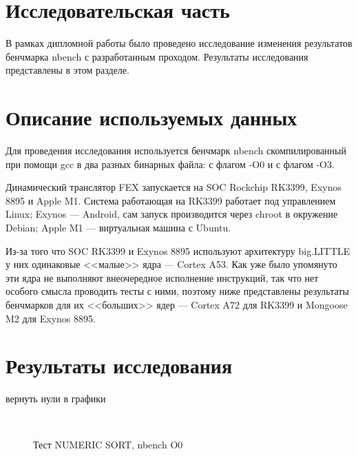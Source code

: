 \section{Исследовательская часть}

В рамках дипломной работы было проведено исследование изменения результатов бенчмарка nbench с разработанным проходом. Результаты исследования представлены в этом разделе.

\section{Описание используемых данных}

Для проведения исследования используется бенчмарк nbench скомпилированный при помощи gcc в два разных бинарных файла: с флагом -O0 и с флагом -O3.

Динамический транслятор FEX запускается на SOC Rockchip RK3399, Exynos 8895 и Apple M1. Система работающая на RK3399 работает под управлением Linux; Exynos --- Android, сам запуск производится через chroot в окружение Debian; Apple M1 --- виртуальная машина с Ubuntu.

Из-за того что SOC RK3399 и Exynos 8895 используют архитектуру big.LITTLE у них одинаковые <<малые>> ядра --- Cortex A53. Как уже было упомянуто эти ядра не выполняют внеочередное исполнение инструкций, так что нет особого смысла проводить тесты с ними, поэтому ниже представлены результаты бенчмарков для их <<больших>> ядер --- Cortex A72 для RK3399 и Mongoose M2 для Exynos 8895.

\section{Результаты исследования}

вернуть нули в графики

\begin{figure}[hbtp]
	\centering
	\\
	\caption{Тест NUMERIC SORT, nbench O0}
	\label{fig:speed}
\end{figure}

